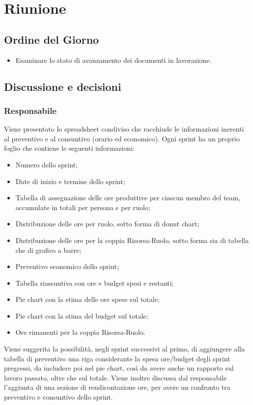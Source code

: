 \section{Riunione}
\subsection{Ordine del Giorno}
\begin{itemize}
	\item Esaminare lo stato di avanzamento dei documenti in lavorazione.
\end{itemize}

\subsection{Discussione e decisioni}

\subsubsection{Responsabile}
Viene presentato lo spreadsheet condiviso che racchiude le informazioni inerenti al preventivo e al consuntivo (orario ed economico). Ogni sprint ha un proprio foglio che contiene le seguenti informazioni:
\begin{itemize}
	\item Numero dello sprint;
	\item Date di inizio e termine dello sprint;
	\item Tabella di assegnazione delle ore produttive per ciascun membro del team, accumulate in totali per persona e per ruolo;
	\item Distribuzione delle ore per ruolo, sotto forma di donut chart;
	\item Distribuzione delle ore per la coppia Risorsa-Ruolo, sotto forma sia di tabella che di grafico a barre;
	\item Preventivo economico dello sprint;
	\item Tabella riassuntiva con ore e budget spesi e restanti;
	\item Pie chart con la stima delle ore spese sul totale;
	\item Pie chart con la stima del budget sul totale;
	\item Ore rimanenti per la coppia Risorsa-Ruolo.
\end{itemize}

\vspace{0.5\baselineskip}
Viene suggerita la possibilità, negli sprint successivi al primo, di aggiungere alla tabella di preventivo una riga considerante la spesa ore/budget degli sprint pregressi, da includere poi nel pie chart, così da avere anche un rapporto sul lavoro passato, oltre che sul totale. Viene inoltre discussa dal responsabile l'aggiunta di una sezione di rendicontazione ore, per avere un confronto tra preventivo e consuntivo dello sprint.

